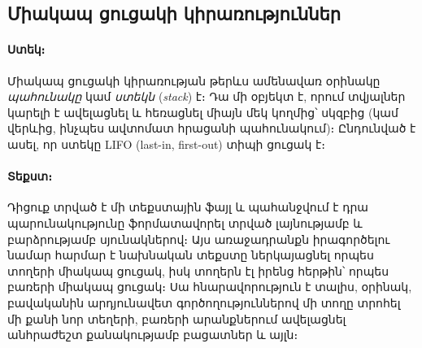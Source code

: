 %
%
%
%
%
%
%
%
%
%
\nwdocspar




%
%
\subsection{Միակապ ցուցակի կիրառություններ}

%
\paragraph{Ստեկ։} Միակապ ցուցակի կիրառության թերևս ամենավառ օրինակը 
\emph{պահունակը} կամ \emph{ստեկն} (\emph{stack}) է։ Դա մի օբյեկտ է, 
որում տվյալներ կարելի է ավելացնել և հեռացնել միայն մեկ կողմից՝ սկզբից 
(կամ վերևից, ինչպես ավտոմատ հրացանի պահունակում)։ Ընդունված է ասել, 
որ ստեկը LIFO (last-in, first-out) տիպի ցուցակ է։ 


%
\paragraph{Տեքստ։} Դիցուք տրված է մի տեքստային ֆայլ և պահանջվում է
դրա պարունակությունը ֆորմատավորել տրված լայնությամբ և բարձրությամբ
սյունակներով։ Այս առաջադրանքն իրագործելու նամար հարմար է նախնական 
տեքստը ներկայացնել որպես տողերի միակապ ցուցակ, իսկ տողերն էլ իրենց 
հերթին՝ որպես բառերի միակապ ցուցակ։ Սա հնարավորություն է տալիս,
օրինակ, բավականին արդյունավետ գործողություններով մի տողը տրոհել մի 
քանի նոր տեղերի, բառերի արանքներում ավելացնել անհրաժեշտ քանակությամբ 
բացատներ և այլն։ 

